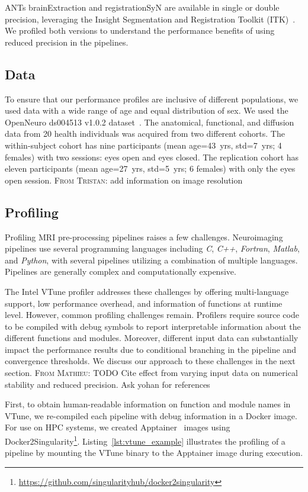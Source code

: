 \documentclass[conference]{IEEEtran}
\renewcommand{\lstlistingname}{Listing}
\newcommand{\TG}[1]{\color{blue}\textsc{From Tristan: }#1\color{black}}
\newcommand{\MD}[1]{\color{magenta}\textsc{From Mathieu: }#1\color{black}}
\begin{document}
ANTs brainExtraction and registrationSyN are available in single or double precision, leveraging the Insight Segmentation and Registration Toolkit (ITK)~\cite{Yoo2002-ve}. We profiled both versions to understand the performance benefits of using reduced precision in the pipelines.

\subsection{Data}
To ensure that our performance profiles are inclusive of different populations, we used data with a wide range of age and equal distribution of sex. We used the OpenNeuro ds004513 v1.0.2 dataset~\cite{ds004513:1.0.2}. The anatomical, functional, and diffusion data from 20 health individuals was acquired from two different cohorts. The within-subject cohort has nine participants (mean age=43~yrs, std=7~yrs; 4 females) with two sessions: eyes open and eyes closed. The replication cohort has eleven participants (mean age=27~yrs, std=5~yrs; 6 females) with only the eyes open session. \TG{add information on image resolution}

\subsection{Profiling}
Profiling MRI pre-processing pipelines raises a few challenges. Neuroimaging pipelines use several programming languages including \textit{C}, \textit{C++}, \textit{Fortran}, \textit{Matlab}, and \textit{Python}, with several pipelines utilizing a combination of multiple languages. Pipelines are generally complex and computationally expensive.

The Intel VTune profiler addresses these challenges by offering multi-language support, low performance overhead, and information of functions at runtime level. However, common profiling challenges remain. Profilers require source code to be compiled with debug symbols to report interpretable information about the different functions and modules. Moreover, different input data can substantially impact the performance results due to conditional branching in the pipeline and convergence thresholds. We discuss our approach to these challenges in the next section.
\MD{TODO Cite effect from varying input data on numerical stability and reduced precision. Ask yohan for references}
		
First, to obtain human-readable information on function and module names in VTune, we re-compiled each pipeline with debug information in a Docker image. For use on HPC systems, we created Apptainer~\cite{Kurtzer2017-bu} images using Docker2Singularity\footnote{\href{https://github.com/singularityhub/docker2singularity}{https://github.com/singularityhub/docker2singularity}}. \lstlistingname~\ref{lst:vtune_example} illustrates the profiling of a pipeline by mounting the VTune binary to the Apptainer image during execution.
\end{document}
